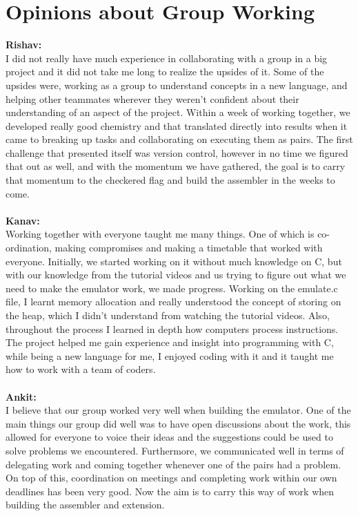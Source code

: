 \documentclass[a4paper]{article}
\begin{document}
\section{Opinions about Group Working}
\textbf{Rishav:}\\
I did not really have much experience in collaborating with a group in a big project and it did not take me long to realize the upsides of it. Some of the upsides were, working as a group to understand concepts in a new language, and helping other teammates wherever they weren't confident about their understanding of an aspect of the project. Within a week of working together, we developed really good chemistry and that translated directly into results when it came to breaking up tasks and collaborating on executing them as pairs. The first challenge that presented itself was version control, however in no time we figured that out as well, and with the momentum we have gathered, the goal is to carry that momentum to the checkered flag and build the assembler in the weeks to come.
\\\\
\textbf{Kanav:}\\
Working together with everyone taught me many things. One of which is co-ordination, making compromises and making a timetable that worked with everyone. Initially, we started working on it without much knowledge on C, but with our knowledge from the tutorial videos and us trying to figure out what we need to make the emulator work, we made progress. Working on the emulate.c file, I learnt memory allocation and really understood the concept of storing on the heap, which I didn’t understand from watching the tutorial videos. Also, throughout the process I learned in depth how computers process instructions. The project helped me gain experience and insight into programming with C, while being a new language for me, I enjoyed coding with it and it taught me how to work with a team of coders.
\\\\
\textbf{Ankit:}\\
I believe that our group worked very well when building the emulator. One of the main things our group did well was to have open discussions about the work, this allowed for everyone to voice their ideas and the suggestions could be used to solve problems we encountered. Furthermore, we communicated well in terms of delegating work and coming together whenever one of the pairs had a problem. On top of this, coordination on meetings and completing work within our own deadlines has been very good. Now the aim is to carry this way of work when building the assembler and extension. 
\end{document}
